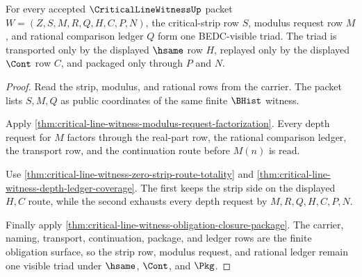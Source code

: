 \begin{theorem}
\label{thm:critical-line-witness-strip-modulus-ledger-triad}
For every accepted $\CriticalLineWitnessUp$ packet $W=(Z,S,M,R,Q,H,C,P,N)$, the critical-strip row $S$, modulus request row $M$, and rational comparison ledger $Q$ form one BEDC-visible triad. The triad is transported only by the displayed $\hsame$ row $H$, replayed only by the displayed $\Cont$ row $C$, and packaged only through $P$ and $N$.
\end{theorem}
\begin{proof}
Read the strip, modulus, and rational rows from the carrier. The packet lists $S,M,Q$ as public coordinates of the same finite $\BHist$ witness.

Apply \autoref{thm:critical-line-witness-modulus-request-factorization}. Every depth request for $M$ factors through the real-part row, the rational comparison ledger, the transport row, and the continuation route before $M(n)$ is read.

Use \autoref{thm:critical-line-witness-zero-strip-route-totality} and \autoref{thm:critical-line-witness-depth-ledger-coverage}. The first keeps the strip side on the displayed $H,C$ route, while the second exhausts every depth request by $M,R,Q,H,C,P,N$.

Finally apply \autoref{thm:critical-line-witness-obligation-closure-package}. The carrier, naming, transport, continuation, package, and ledger rows are the finite obligation surface, so the strip row, modulus request, and rational ledger remain one visible triad under $\hsame$, $\Cont$, and $\Pkg$.
\end{proof}

